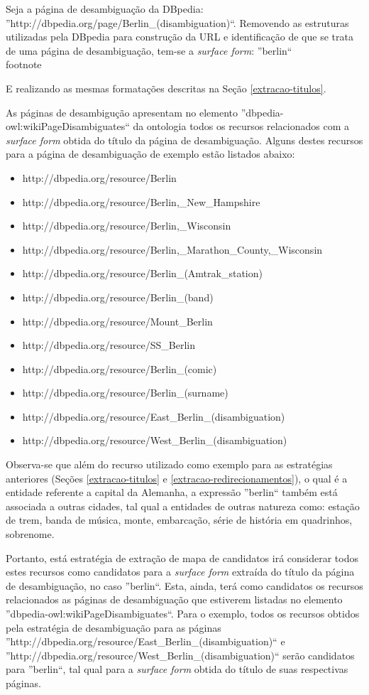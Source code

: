 \documentclass[10pt,a4paper]{llncs}
\begin{document}
Seja a página de desambiguação da DBpedia: ''http://dbpedia.org/page/Berlin\_(disambiguation)``. Removendo as estruturas utilizadas pela DBpedia para construção da URL e identificação de que se trata de uma página de desambiguação, tem-se a \textit{surface form}: ''berlin``\\footnote{E realizando as mesmas formatações descritas na Seção \ref{extracao-titulos}.

As páginas de desambigução apresentam no elemento ''dbpedia-owl:wikiPageDisambiguates`` da ontologia todos os recursos relacionados com a \textit{surface form} obtida do título da página de desambiguação. Alguns destes recursos para a página de desambiguação de exemplo estão listados abaixo:
\begin{itemize}
 \item http://dbpedia.org/resource/Berlin
 \item http://dbpedia.org/resource/Berlin,\_New\_Hampshire
 \item http://dbpedia.org/resource/Berlin,\_Wisconsin
 \item http://dbpedia.org/resource/Berlin,\_Marathon\_County,\_Wisconsin
 \item http://dbpedia.org/resource/Berlin\_(Amtrak\_station)
 \item http://dbpedia.org/resource/Berlin\_(band)
 \item http://dbpedia.org/resource/Mount\_Berlin
 \item http://dbpedia.org/resource/SS\_Berlin
 \item http://dbpedia.org/resource/Berlin\_(comic)
 \item http://dbpedia.org/resource/Berlin\_(surname)
 \item http://dbpedia.org/resource/East\_Berlin\_(disambiguation)
 \item http://dbpedia.org/resource/West\_Berlin\_(disambiguation)
\end{itemize}

Observa-se que além do recurso utilizado como exemplo para as estratégias anteriores (Seções \ref{extracao-titulos} e \ref{extracao-redirecionamentos}), o qual é a entidade referente a capital da Alemanha, a expressão ''berlin`` também está associada a outras cidades, tal qual a entidades de outras natureza como: estação de trem, banda de música, monte, embarcação, série de história em quadrinhos, sobrenome.

Portanto, está estratégia de extração de mapa de candidatos irá considerar todos estes recursos como candidatos para a \textit{surface form} extraída do título da página de desambiguação, no caso ''berlin``. Esta, ainda, terá como candidatos os recursos relacionados as páginas de desambiguação que estiverem listadas no elemento ''dbpedia-owl:wikiPageDisambiguates``. Para o exemplo, todos os recursos obtidos pela estratégia de desambiguação para as páginas ''http://dbpedia.org/resource/East\_Berlin\_(disambiguation)`` e ''http://dbpedia.org/resource/West\_Berlin\_(disambiguation)`` serão candidatos para ''berlin``, tal qual para a \textit{surface form} obtida do título de suas respectivas páginas.

}
\end{document}
